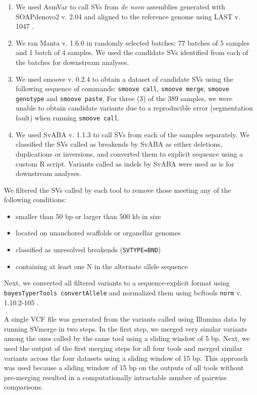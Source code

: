 \documentclass[12pt]{report}
\begin{document}
\begin{enumerate}

\item We used AsmVar \citep[version of 2015-04-16, ][]{liu2015} to call SVs
	from \emph{de novo} assemblies generated with SOAPdenovo2 v. 2.04
		\citep{luo2012} and aligned to the reference genome using LAST
		v. 1047 \citep{kielbasa2011}.
\item We ran Manta v. 1.6.0 \citep{chen2016} in randomly selected batches: 77 batches of
	5 samples and 1 batch of 4 samples. We used the candidate SVs
		identified from each of the batches for downstream analyses.
\item We used smoove v. 0.2.4 \citep{pedersen2019} to obtain a dataset of candidate SVs
	using the following sequence of commands:
	\texttt{smoove call}, \texttt{smoove merge}, \texttt{smoove
		genotype} and \texttt{smoove paste}.
		For three (3) of the 389 samples, we were unable
		to obtain candidate variants due to a reproducible
		error (segmentation fault) when running \texttt{smoove
		call}.
	\item We used SvABA v. 1.1.3 \citep{wala2018} to call SVs from each of the
	samples separately. We classified the SVs called as breakends by SvABA
		as either deletions, duplications or inversions, and converted
		them to explicit sequence using a custom R script. Variants
		called as indels by SvABA were used as is for downstream
		analyses.
\end{enumerate}

We filtered the SVs called by each tool to remove those meeting any of the following conditions:

\begin{itemize}
	\item smaller than 50 bp or larger than 500 kb in size
	\item located on unanchored scaffolds or organellar genomes
	\item classified as unresolved breakends (\texttt{SVTYPE=BND})
	\item containing at least one N in the alternate allele sequence
\end{itemize}

Next, we converted all filtered variants to a sequence-explicit format using
\texttt{bayesTyperTools convertAllele} \citep{sibbesen2018} and normalized them
using bcftools \texttt{norm} v. 1.10.2-105 \citep{li2009-samtools}.

A single VCF file was generated from the variants called using Illumina data by
running SVmerge \citep{wong2010} in two steps. In the first step, we merged
very similar variants among the ones called by the same tool using a
sliding window of 5 bp. Next, we used the output of the first merging steps
for all four tools and merged similar variants across the four datasets using
a sliding window of 15 bp. This approach was used because a
sliding window of 15 bp on the outputs of all tools without pre-merging
resulted in a computationally intractable number of pairwise comparisons.
\end{document}
